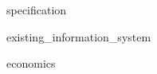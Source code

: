 \documentclass[a4paper,utf8,pointsection]{eskdtext}
\begin{document}




\maketitle
\tableofcontents
\newpage


{specification}

{existing_information_system}

{economics}

\end{document}
